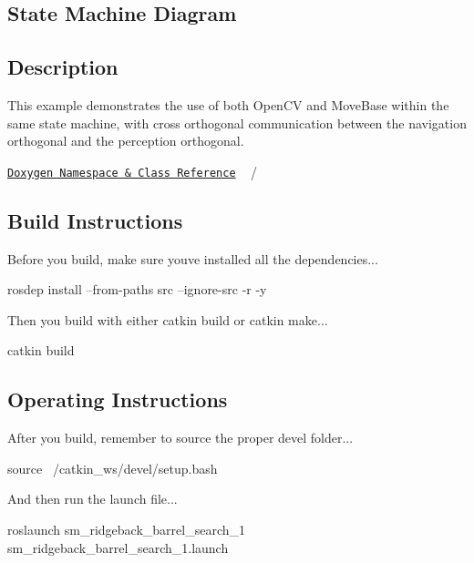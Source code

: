 \subsection*{State Machine Diagram}



\subsection*{Description}

This example demonstrates the use of both Open\+CV and Move\+Base within the same state machine, with cross orthogonal communication between the navigation orthogonal and the perception orthogonal.~\newline


\href{https://reelrbtx.github.io/SMACC_Documentation/master/html/namespacesm__moveit.html}{\tt Doxygen Namespace \& Class Reference} ~\newline
/~\newline
 

\subsection*{Build Instructions}

Before you build, make sure you\textquotesingle{}ve installed all the dependencies...


\begin{DoxyCode}
rosdep install --from-paths src --ignore-src -r -y 
\end{DoxyCode}


Then you build with either catkin build or catkin make...


\begin{DoxyCode}
catkin build
\end{DoxyCode}


\subsection*{Operating Instructions}

After you build, remember to source the proper devel folder...


\begin{DoxyCode}
source ~/catkin\_ws/devel/setup.bash
\end{DoxyCode}


And then run the launch file...


\begin{DoxyCode}
roslaunch sm\_ridgeback\_barrel\_search\_1 sm\_ridgeback\_barrel\_search\_1.launch
\end{DoxyCode}


